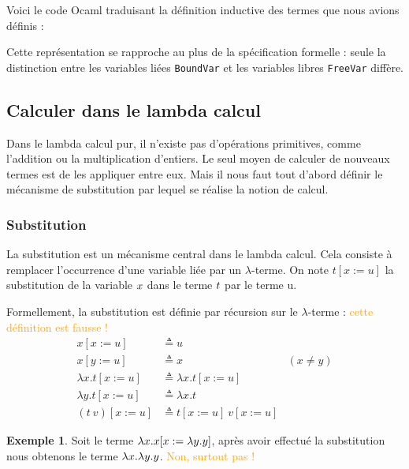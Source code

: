 \documentclass {article}
\newcommand{\codefrom}[3]
           {}
\theoremstyle{definition}
\newtheorem{example}{Exemple}
\theoremstyle{remark}
\newcommand{\attention}[1]{\textcolor{orange}{#1}}
\begin{document}
Voici le code Ocaml traduisant la définition inductive des termes que
nous avions définis :
%
\codefrom{untyped}{lambda}{untyped_term}

Cette représentation se rapproche au plus de la spécification formelle
: seule la distinction entre les variables liées \lstinline!BoundVar!
et les variables libres \lstinline!FreeVar! diffère.



  
\subsection{Calculer dans le lambda calcul}
\label{calculer_dans_le_lambda_calcul}

Dans le lambda calcul pur, il n'existe pas d'opérations primitives, comme l'addition ou la multiplication d'entiers. Le seul moyen de calculer de nouveaux termes est de les appliquer 
entre eux. Mais il nous faut tout d'abord définir le mécanisme de substitution par lequel se réalise la notion de calcul.

\subsubsection{Substitution}

\newcommand{\subst}[3]{#1[#2 := #3]}


La substitution est un mécanisme central dans le lambda calcul. Cela consiste 
à remplacer l'occurrence d'une variable liée par un \(\lambda\)-terme.
On note \(\subst{t}{x}{u}\) la substitution de la variable $x$ dans le terme $t$ par le 
terme u.

Formellement, la substitution est définie par récursion sur le $\lambda$-terme : \attention{cette définition est fausse !}
\begin{align*}
    \subst{x}{x}{u} &\triangleq u \\
    \subst{x}{y}{u} &\triangleq x & (x \neq y)\\
    \subst{\lambda x.t}{x}{u} &\triangleq \lambda x.\subst{t}{x}{u} \\
    \subst{\lambda y.t}{x}{u} &\triangleq \lambda x.t \\
    \subst{(t\: v)}{x}{u} &\triangleq \subst{t}{x}{u}\: \subst{v}{x}{u}
\end{align*}

\begin{example}
  Soit le terme $\Lam{x}{\subst{x}{x}{\Lam{y}{y}}}$, après avoir effectué la
  substitution nous obtenons le terme $\lambda x. \lambda y. y$.
  \attention{Non, surtout pas !}
\end{example}
\end{document}
